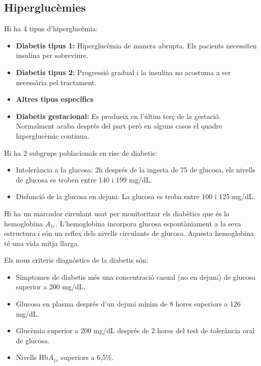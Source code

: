 \subsection{Hiperglucèmies}
\label{sec:hiperglucemies}
Hi ha 4 tipus d'hiperglucèmia:
\begin{itemize}
\item \textbf{Diabetis tipus 1:} Hiperglucèmia de manera abrupta. Els pacients
  necessiten insulina per sobreviure.
\item \textbf{Diabetis tipus 2:} Progressió gradual i la insulina no acostuma a
  ser necessària pel tractament.
\item \textbf{Altres tipus específics}
\item \textbf{Diabetis gestacional:} Es produeix en l'últim terç de la
  gestació. Normalment acaba després del part però en alguns casos el
  quadre hiperglucèmic continua.
\end{itemize}

Hi ha 2 subgrups poblacionals en risc de diabetis:
\begin{itemize}
\item Intolerància a la glucosa: 2h després de la ingesta de 75 de
  glucosa, els nivells de glucosa es troben entre 140 i 199 mg/dL.

\item Disfunció de la glucosa en dejuni: La glucosa es troba entre 100
  i 125 mg/dL.
\end{itemize}

Hi ha un marcador circulant usat per monitoritzar els diabètics que és
la hemoglobina $A_{1c}$. L'hemoglobina incorpora glucosa
espontàniament a la seva estructura i són un reflex dels nivells
circulants de glucosa. Aquesta hemoglobina té una vida mitja llarga.

Els nous criteris diagnòstics de la diabetis són:
\begin{itemize}
\item Símptomes de diabetis més una concentració casual (no en dejuni)
  de glucosa superior a 200 mg/dL.
\item Glucosa en plasma després d'un dejuni mínim de 8 hores superiors
  a 126 mg/dL.
\item Glucèmia superior a 200 mg/dL després de 2 hores del test de
  tolerància oral de glucosa.
\item Nivells Hb$A_{1c}$ superiors a 6,5\%.
\end{itemize}

